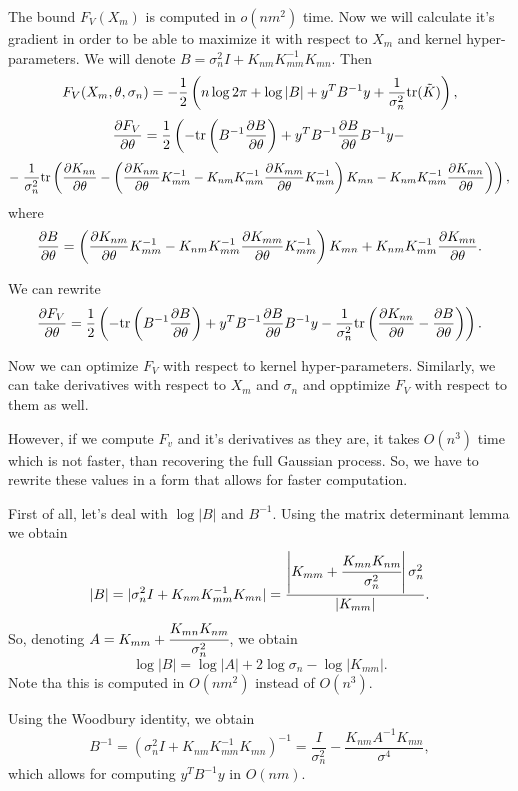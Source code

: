 \documentclass[12pt]{article}
\begin{document}
		The bound $F_V(X_m)$ is computed in $o(nm^2)$ time. Now we will calculate it's gradient in order to be able to maximize it with respect to $X_m$ and kernel hyper-parameters. We will denote $B = \sigma_n^2 I + K_{nm} K_{mm}^{-1} K_{mn}$. Then
		$$F_V(X_m, \theta, \sigma_n) = -\frac 1 2 \left(n \log 2\pi + \log |B| + y^T B^{-1} y + \frac 1 {\sigma_n^2} \mbox{tr}(\tilde K)\right),$$
		$$\frac{\partial F_V}{\partial \theta} = \frac 1 2 \left( -\mbox{tr} \left(B^{-1} \frac{\partial B}{\partial \theta}\right) + y^T B^{-1} \frac{\partial B}{\partial \theta} B^{-1} y - \right.$$    
		$$- \left. \frac 1 {\sigma_n^2} \mbox{tr}\left(\frac{\partial K_{nn}}{\partial \theta} - \left(\frac{\partial K_{nm}}{\partial \theta}K_{mm}^{-1} - K_{nm} K_{mm}^{-1} \frac{\partial K_{mm}}{\partial \theta}K_{mm}^{-1}\right) K_{mn} - K_{nm} K_{mm}^{-1} \frac{\partial K_{mn}}{\partial \theta}\right)\right),$$
		where
		$$\frac{\partial B}{\partial \theta} =\left(\frac{\partial K_{nm}}{\partial \theta}K_{mm}^{-1} - K_{nm} K_{mm}^{-1} \frac{\partial K_{mm}}{\partial \theta}K_{mm}^{-1}\right) K_{mn} +  K_{nm} K_{mm}^{-1} \frac{\partial K_{mn}}{\partial \theta}.$$

		We can rewrite
		$$\frac{\partial F_V}{\partial \theta} = \frac 1 2 \left( -\mbox{tr} \left(B^{-1} \frac{\partial B}{\partial \theta}\right) + y^T B^{-1} \frac{\partial B}{\partial \theta} B^{-1} y - \frac 1 {\sigma_n^2} \mbox{tr} \left(\frac{\partial K_{nn}}{\partial \theta} - \frac{\partial B}{\partial \theta}\right) \right).$$

		Now we can optimize $F_V$ with respect to kernel hyper-parameters. Similarly, we can take derivatives with respect to $X_m$ and $\sigma_n$ and opptimize $F_V$ with respect to them as well.

		However, if we compute $F_v$ and it's derivatives as they are, it takes $O(n^3)$ time which is not faster, than recovering the full Gaussian process. So, we have to rewrite these values in a form that allows for faster computation.

		First of all, let's deal with $\log|B|$ and $B^{-1}$. Using the matrix determinant lemma we obtain
		$$|B| = |\sigma_n^2 I + K_{nm} K_{mm}^{-1} K_{mn}| = \frac{\left|K_{mm} + \cfrac{K_{mn} K_{nm}}{\sigma_n^2}\right| \sigma_n^2}{|K_{mm}|}.$$
		So, denoting $A = K_{mm} + \cfrac{K_{mn} K_{nm}}{\sigma_n^2}$, we obtain
		$$\log |B| = \log |A| + 2 \log \sigma_n - \log |K_{mm}|.$$
		Note tha this is computed in $O(n m^2)$ instead of $O(n^3)$.

		Using the Woodbury identity, we obtain
		$$B^{-1} = (\sigma_n^2 I + K_{nm} K_{mm}^{-1} K_{mn})^{-1} = \frac I {\sigma_n^2} - \frac{K_{nm} A^{-1} K_{mn}}{\sigma^{4}},$$
		which allows for computing $y^T B^{-1} y$ in $O(n m)$.
\end{document}
